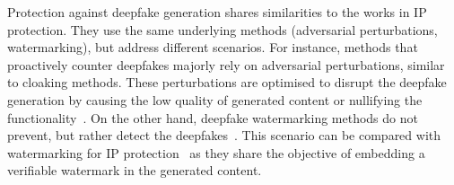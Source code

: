 Protection against deepfake generation shares similarities to the works in IP protection. 
They use the same underlying methods (adversarial perturbations, watermarking), but address different scenarios.
For instance, methods that proactively counter deepfakes majorly rely on adversarial perturbations, similar to cloaking methods. 
These perturbations are optimised to disrupt the deepfake generation by causing the low quality of generated content or nullifying the functionality~\cite{ruiz_disrupting_2020,dong_restricted_2023,ruiz_practical_2023}. 
On the other hand, deepfake watermarking methods do not prevent, but rather detect the deepfakes~\cite{wang_faketagger_2021,wu_sepmark_2023}. 
This scenario can be compared with watermarking for IP protection~\cite{lederer_identifying_2023} as they share the objective of embedding a verifiable watermark in the generated content.







